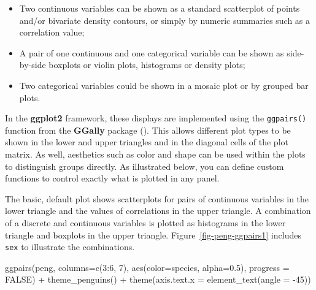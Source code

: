 \documentclass[
  letterpaper,
  10pt,
  krantz2]{krantz}
\makeatletter
\newenvironment{Shaded}{\begin{snugshade}}{\end{snugshade}}
\newcommand{\AttributeTok}[1]{\textcolor[rgb]{0.40,0.45,0.13}{#1}}
\newcommand{\ConstantTok}[1]{\textcolor[rgb]{0.56,0.35,0.01}{#1}}
\newcommand{\DecValTok}[1]{\textcolor[rgb]{0.68,0.00,0.00}{#1}}
\newcommand{\FloatTok}[1]{\textcolor[rgb]{0.68,0.00,0.00}{#1}}
\newcommand{\FunctionTok}[1]{\textcolor[rgb]{0.28,0.35,0.67}{#1}}
\newcommand{\NormalTok}[1]{\textcolor[rgb]{0.00,0.23,0.31}{#1}}
\newcommand{\SpecialCharTok}[1]{\textcolor[rgb]{0.37,0.37,0.37}{#1}}
\providecommand{\tightlist}{%
  \setlength{\itemsep}{0pt}\setlength{\parskip}{0pt}}\usepackage{longtable,booktabs,array}
\newenvironment{kframe}{%
  \medskip{}
  \setlength{\fboxsep}{.8em}
  \def\at@end@of@kframe{}%
  \ifinner\ifhmode%
  \def\at@end@of@kframe{\end{minipage}}%
  \begin{minipage}{\columnwidth}%
  \fi\fi%
  \def\FrameCommand##1{\hskip\@totalleftmargin \hskip-\fboxsep
  \colorbox{shadecolor}{##1}\hskip-\fboxsep
      \hskip-\linewidth \hskip-\@totalleftmargin \hskip\columnwidth}%
  \MakeFramed {\advance\hsize-\width
    \@totalleftmargin\z@ \linewidth\hsize
    \@setminipage}}%
{\par\unskip\endMakeFramed%
  \at@end@of@kframe}
\renewenvironment{Shaded}{\begin{kframe}}{\end{kframe}}
\makeatother
\begin{document}
\begin{itemize}
\tightlist
\item
  Two continuous variables can be shown as a standard scatterplot of
  points and/or bivariate density contours, or simply by numeric
  summaries such as a correlation value;
\item
  A pair of one continuous and one categorical variable can be shown as
  side-by-side boxplots or violin plots, histograms or density plots;
\item
  Two categorical variables could be shown in a mosaic plot or by
  grouped bar plots.
\end{itemize}

In the \textbf{ggplot2} framework, these displays are implemented using
the \texttt{ggpairs()} function from the \textbf{GGally} package
(). This allows different
plot types to be shown in the lower and upper triangles and in the
diagonal cells of the plot matrix. As well, aesthetics such as color and
shape can be used within the plots to distinguish groups directly. As
illustrated below, you can define custom functions to control exactly
what is plotted in any panel.

The basic, default plot shows scatterplots for pairs of continuous
variables in the lower triangle and the values of correlations in the
upper triangle. A combination of a discrete and continuous variables is
plotted as histograms in the lower triangle and boxplots in the upper
triangle. Figure~\ref{fig-peng-ggpairs1} includes \texttt{sex} to
illustrate the combinations.

\begin{Shaded}
\begin{Highlighting}[]
\FunctionTok{ggpairs}\NormalTok{(peng, }\AttributeTok{columns=}\FunctionTok{c}\NormalTok{(}\DecValTok{3}\SpecialCharTok{:}\DecValTok{6}\NormalTok{, }\DecValTok{7}\NormalTok{),}
        \FunctionTok{aes}\NormalTok{(}\AttributeTok{color=}\NormalTok{species, }\AttributeTok{alpha=}\FloatTok{0.5}\NormalTok{),}
        \AttributeTok{progress =} \ConstantTok{FALSE}\NormalTok{) }\SpecialCharTok{+}
  \FunctionTok{theme\_penguins}\NormalTok{() }\SpecialCharTok{+}
  \FunctionTok{theme}\NormalTok{(}\AttributeTok{axis.text.x =} \FunctionTok{element\_text}\NormalTok{(}\AttributeTok{angle =} \SpecialCharTok{{-}}\DecValTok{45}\NormalTok{))}
\end{Highlighting}
\end{Shaded}
\end{document}
